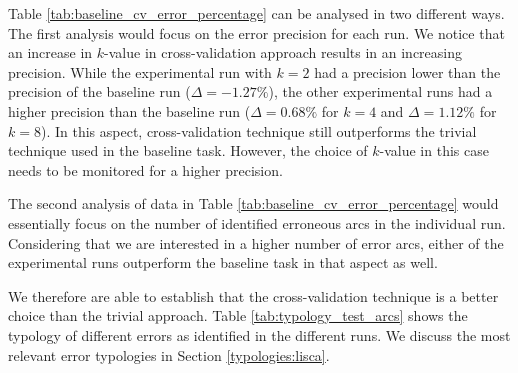 Table \ref{tab:baseline_cv_error_percentage} can be analysed in two different ways. The first analysis would focus on the error precision for each run. We notice that an increase in \(k\)-value in cross-validation approach results in an increasing precision. While the experimental run with \(k=2\) had a precision lower than the precision of the baseline run (\(\Delta = -1.27 \%\)), the other experimental runs had a higher precision than the baseline run (\(\Delta = 0.68 \%\) for \(k=4\) and \(\Delta = 1.12 \%\) for \(k=8\)). In this aspect, cross-validation technique still outperforms the trivial technique used in the baseline task. However, the choice of \(k\)-value in this case needs to be monitored for a higher precision.

The second analysis of data in Table \ref{tab:baseline_cv_error_percentage} would essentially focus on the number of identified erroneous arcs in the individual run. Considering that we are interested in a higher number of error arcs, either of the experimental runs outperform the baseline task in that aspect as well.

We therefore are able to establish that the cross-validation technique is a better choice than the trivial approach. Table \ref{tab:typology_test_arcs} shows the typology of different errors as identified in the different runs. We discuss the most relevant error typologies in Section \ref{typologies:lisca}.

